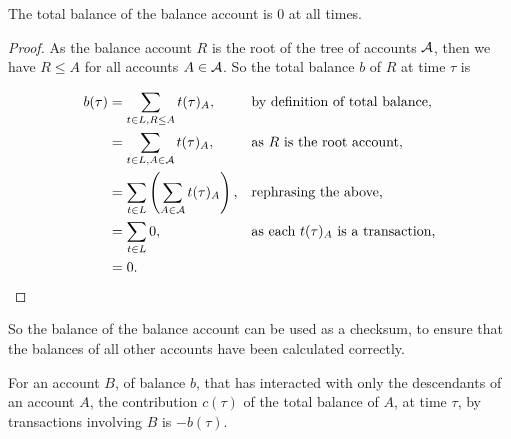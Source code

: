 \begin{theorem}
    The total balance of the balance account is $0$ at all times.
\end{theorem}

\begin{proof}
    As the balance account $R$ is the root of the tree of accounts $\mathcal{A}$, then we have $R \le A$ for all accounts $A \in \mathcal{A}$.
    So the total balance $b$ of $R$ at time $\tau$ is

    \begin{align*}
        b(\tau) &= \sum_{t \in L, R \le A} t(\tau)_A, && \text{by definition of total balance,} \\
        &= \sum_{t \in L, A \in \mathcal{A}} t(\tau)_A, && \text{as $R$ is the root account,} \\
        &= \sum_{t \in L} \left(\sum_{A \in \mathcal{A}} t(\tau)_A\right), && \text{rephrasing the above,} \\
        &= \sum_{t \in L} 0, && \text{as each $t(\tau)_A$ is a transaction,} \\
        &= 0.
    \end{align*}
\end{proof}

So the balance of the balance account can be used as a checksum, to ensure that the balances of all other accounts have been calculated correctly.

\begin{theorem}
    For an account $B$, of balance $b$, that has interacted with only the descendants of an account $A$,
    the contribution $c(\tau)$ of the total balance of $A$, at time $\tau$, by transactions involving $B$ is $- b(\tau)$.
\end{theorem}

